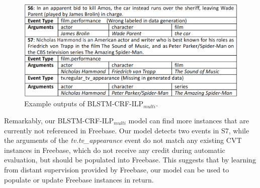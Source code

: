 \begin{figure}[t!]
	\centering
	\includegraphics[width=.48\textwidth]{figure3(3).png}
    \vspace{-5mm}
	\caption{Example outputs of BLSTM-CRF-ILP$_{multi}$.\label{fig:1}}
    \vspace{-5mm}
\end{figure}




Remarkably, our BLSTM-CRF-ILP$_{multi}$ model can find more \CVT instances that are currently not referenced in Freebase. Our model detects two events in S7, while the arguments of the \textit{tv.tv\_appearance} event do not match any existing CVT instances in Freebase, which do not receive any credit during automatic evaluation, but should be populated into Freebase. %
This  suggests that by learning from distant supervision provided by Freebase, our model can be used to populate or update Freebase instances in return.

